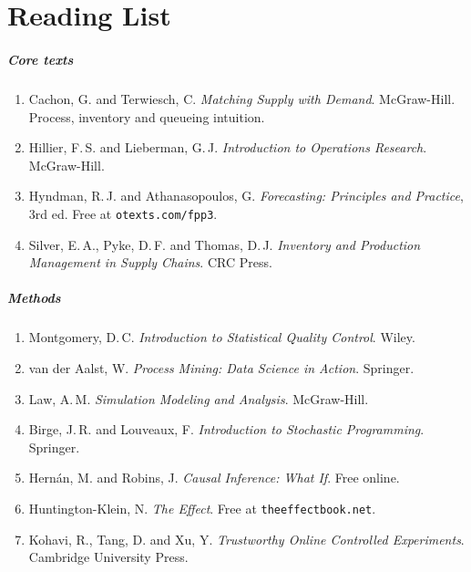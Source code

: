 \chapter{Reading List}
\paragraph{Core texts}
\begin{enumerate}[nosep]
\item Cachon, G. and Terwiesch, C. \emph{Matching Supply with Demand}. McGraw-Hill. Process, inventory and queueing intuition.
\item Hillier, F.\,S. and Lieberman, G.\,J. \emph{Introduction to Operations Research}. McGraw-Hill.
\item Hyndman, R.\,J. and Athanasopoulos, G. \emph{Forecasting: Principles and Practice}, 3rd ed. Free at \texttt{otexts.com/fpp3}.
\item Silver, E.\,A., Pyke, D.\,F. and Thomas, D.\,J. \emph{Inventory and Production Management in Supply Chains}. CRC Press.
\end{enumerate}
\paragraph{Methods}
\begin{enumerate}[nosep]
\item Montgomery, D.\,C. \emph{Introduction to Statistical Quality Control}. Wiley.
\item van der Aalst, W. \emph{Process Mining: Data Science in Action}. Springer.
\item Law, A.\,M. \emph{Simulation Modeling and Analysis}. McGraw-Hill.
\item Birge, J.\,R. and Louveaux, F. \emph{Introduction to Stochastic Programming}. Springer.
\item Hern\'an, M. and Robins, J. \emph{Causal Inference: What If}. Free online.
\item Huntington-Klein, N. \emph{The Effect}. Free at \texttt{theeffectbook.net}.
\item Kohavi, R., Tang, D. and Xu, Y. \emph{Trustworthy Online Controlled Experiments}. Cambridge University Press.
\end{enumerate}
